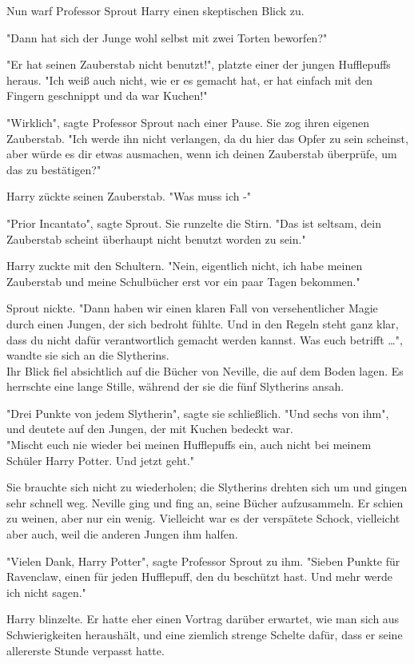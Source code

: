 {Nun warf Professor Sprout Harry einen skeptischen Blick zu.

"Dann hat sich der Junge wohl selbst mit zwei Torten beworfen?"

"Er hat seinen Zauberstab nicht benutzt!", platzte einer der jungen Hufflepuffs heraus. "Ich weiß auch nicht, wie er es gemacht hat, er hat einfach mit den Fingern geschnippt und da war Kuchen!"

"Wirklich", sagte Professor Sprout nach einer Pause. Sie zog ihren eigenen Zauberstab. "Ich werde ihn nicht verlangen, da du hier das Opfer zu sein scheinst, aber würde es dir etwas ausmachen, wenn ich deinen Zauberstab überprüfe, um das zu bestätigen?"

Harry zückte seinen Zauberstab. "Was muss ich -"

"Prior Incantato", sagte Sprout. Sie runzelte die Stirn. "Das ist seltsam, dein Zauberstab scheint überhaupt nicht benutzt worden zu sein."

Harry zuckte mit den Schultern. "Nein, eigentlich nicht, ich habe meinen Zauberstab und meine Schulbücher erst vor ein paar Tagen bekommen."

Sprout nickte. "Dann haben wir einen klaren Fall von versehentlicher Magie durch einen Jungen, der sich bedroht fühlte. Und in den Regeln steht ganz klar, dass du nicht dafür verantwortlich gemacht werden kannst. Was euch betrifft …", wandte sie sich an die Slytherins.\\ Ihr Blick fiel absichtlich auf die Bücher von Neville, die auf dem Boden lagen. Es herrschte eine lange Stille, während der sie die fünf Slytherins ansah.

"Drei Punkte von jedem Slytherin", sagte sie schließlich. "Und sechs von ihm", und deutete auf den Jungen, der mit Kuchen bedeckt war.\\ "Mischt euch nie wieder bei meinen Hufflepuffs ein, auch nicht bei meinem Schüler Harry Potter. Und jetzt geht."

Sie brauchte sich nicht zu wiederholen; die Slytherins drehten sich um und gingen sehr schnell weg. Neville ging und fing an, seine Bücher aufzusammeln. Er schien zu weinen, aber nur ein wenig. Vielleicht war es der verspätete Schock, vielleicht aber auch, weil die anderen Jungen ihm halfen.

"Vielen Dank, Harry Potter", sagte Professor Sprout zu ihm. "Sieben Punkte für Ravenclaw, einen für jeden Hufflepuff, den du beschützt hast. Und mehr werde ich nicht sagen."

Harry blinzelte. Er hatte eher einen Vortrag darüber erwartet, wie man sich aus Schwierigkeiten heraushält, und eine ziemlich strenge Schelte dafür, dass er seine allererste Stunde verpasst hatte.

}
